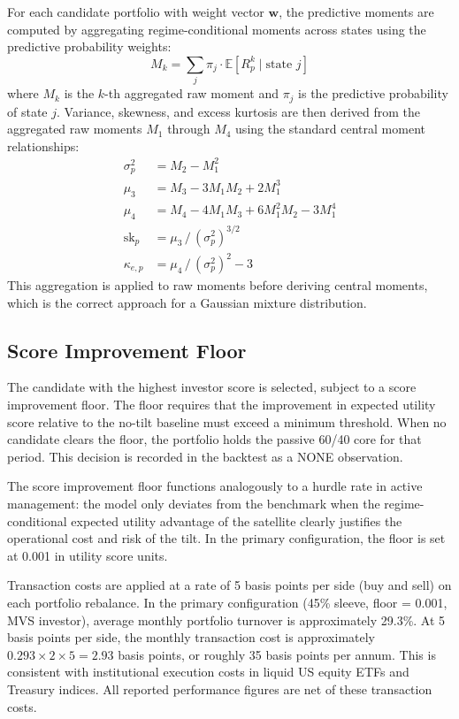 \documentclass[12pt, a4paper]{article}
\begin{document}
For each candidate portfolio with weight vector $\mathbf{w}$, the predictive moments are
computed by aggregating regime-conditional moments across states using the predictive
probability weights:
\begin{equation}
  M_k = \sum_{j} \pi_j \cdot \mathbb{E}\!\left[R_p^k \mid \text{state } j\right]
\end{equation}
where $M_k$ is the $k$-th aggregated raw moment and $\pi_j$ is the predictive probability
of state $j$. Variance, skewness, and excess kurtosis are then derived from the aggregated
raw moments $M_1$ through $M_4$ using the standard central moment relationships:
\begin{align}
  \sigma^2_p     &= M_2 - M_1^2 \\
  \mu_3          &= M_3 - 3M_1 M_2 + 2M_1^3 \\
  \mu_4          &= M_4 - 4M_1 M_3 + 6M_1^2 M_2 - 3M_1^4 \\
  \text{sk}_p    &= \mu_3 \,/\, (\sigma^2_p)^{3/2} \\
  \kappa_{e,p}   &= \mu_4 \,/\, (\sigma^2_p)^{2} - 3
\end{align}
This aggregation is applied to raw moments before deriving central moments, which is the
correct approach for a Gaussian mixture distribution.

\subsection{Score Improvement Floor}

The candidate with the highest investor score is selected, subject to a score improvement
floor. The floor requires that the improvement in expected utility score relative to the
no-tilt baseline must exceed a minimum threshold. When no candidate clears the floor, the
portfolio holds the passive 60/40 core for that period. This decision is recorded in the
backtest as a NONE observation.

The score improvement floor functions analogously to a hurdle rate in active management:
the model only deviates from the benchmark when the regime-conditional expected utility
advantage of the satellite clearly justifies the operational cost and risk of the tilt.
In the primary configuration, the floor is set at 0.001 in utility score units.

Transaction costs are applied at a rate of 5 basis points per side (buy and sell) on each
portfolio rebalance. In the primary configuration (45\% sleeve, floor = 0.001, MVS investor),
average monthly portfolio turnover is approximately 29.3\%. At 5 basis points per side, the
monthly transaction cost is approximately $0.293 \times 2 \times 5 = 2.93$ basis points, or
roughly 35 basis points per annum. This is consistent with institutional execution costs in
liquid US equity ETFs and Treasury indices. All reported performance figures are net of these
transaction costs.
\end{document}
